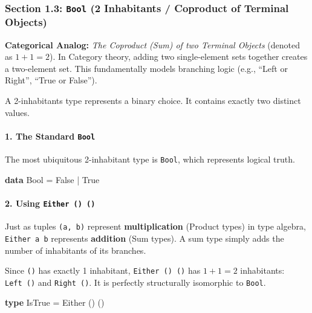 \documentclass[
]{article}
\newenvironment{Shaded}{}{}
\newcommand{\DataTypeTok}[1]{\textcolor[rgb]{0.56,0.13,0.00}{#1}}
\newcommand{\KeywordTok}[1]{\textcolor[rgb]{0.00,0.44,0.13}{\textbf{#1}}}
\newcommand{\NormalTok}[1]{#1}
\newcommand{\OperatorTok}[1]{\textcolor[rgb]{0.40,0.40,0.40}{#1}}
\newcommand{\OtherTok}[1]{\textcolor[rgb]{0.00,0.44,0.13}{#1}}
\begin{document}
\subsubsection{\texorpdfstring{Section 1.3: \texttt{Bool} (2 Inhabitants
/ Coproduct of Terminal
Objects)}{Section 1.3: Bool (2 Inhabitants / Coproduct of Terminal Objects)}}\label{section-1.3-bool-2-inhabitants-coproduct-of-terminal-objects}

\textbf{Categorical Analog:} \emph{The Coproduct (Sum) of two Terminal
Objects} (denoted as \(1 + 1 = 2\)). In Category theory, adding two
single-element sets together creates a two-element set. This
fundamentally models branching logic (e.g., ``Left or Right'', ``True or
False'').

A 2-inhabitants type represents a binary choice. It contains exactly two
distinct values.

\paragraph{\texorpdfstring{1. The Standard
\texttt{Bool}}{1. The Standard Bool}}\label{the-standard-bool}

The most ubiquitous 2-inhabitant type is \texttt{Bool}, which represents
logical truth.

\begin{Shaded}
\begin{Highlighting}[]
\KeywordTok{data} \DataTypeTok{Bool} \OtherTok{=} \DataTypeTok{False} \OperatorTok{|} \DataTypeTok{True}
\end{Highlighting}
\end{Shaded}

\paragraph{\texorpdfstring{2. Using
\texttt{Either\ ()\ ()}}{2. Using Either () ()}}\label{using-either}

Just as tuples \texttt{(a,\ b)} represent \textbf{multiplication}
(Product types) in type algebra, \texttt{Either\ a\ b} represents
\textbf{addition} (Sum types). A sum type simply adds the number of
inhabitants of its branches.

Since \texttt{()} has exactly 1 inhabitant, \texttt{Either\ ()\ ()} has
\(1 + 1 = 2\) inhabitants: \texttt{Left\ ()} and \texttt{Right\ ()}. It
is perfectly structurally isomorphic to \texttt{Bool}.

\begin{Shaded}
\begin{Highlighting}[]
\KeywordTok{type} \DataTypeTok{IsTrue} \OtherTok{=} \DataTypeTok{Either}\NormalTok{ () ()}
\end{Highlighting}
\end{Shaded}
\end{document}
